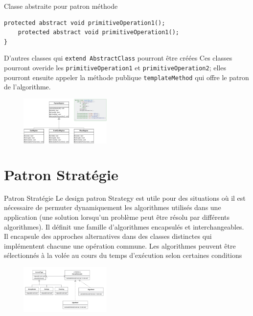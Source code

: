 \documentclass[16pt]{report}
\begin{document}
\begin{multicols*}{2}
\begin{EExample}{Classe abstraite pour patron méthode}{}
\begin{lstlisting}[style=JavaDraculaWhite]
    protected abstract void primitiveOperation1(); 
    protected abstract void primitiveOperation1(); 
}       
\end{lstlisting}
        \end{EExample}

        D'autres classes qui \texttt{extend AbstractClass} pourront être créées 
        Ces classes pourront overide les \texttt{primitiveOperation1} et \texttt{primitiveOperation2}; 
        elles pourront ensuite appeler la méthode publique \texttt{templateMethod} qui offre 
        le patron de l'algorithme. 


        \begin{figure}[H]
            \begin{center}
                \includegraphics[width=0.40\textwidth]{patronMethode.png}
            \end{center}
        \end{figure}

        
        \section{Patron Stratégie}

        \begin{Concept}{Patron Stratégie}{}
            Le design patron Strategy est utile pour des situations où il est nécessaire de permuter
            dynamiquement les algorithmes utilisés dans une application (une solution lorsqu'un
            problème peut être résolu par différents algorithmes).
            Il définit une famille d'algorithmes encapsulés et interchangeables. Il encapsule des
            approches alternatives dans des classes distinctes qui implémentent chacune une
            opération commune.
            Les algorithmes peuvent être sélectionnés à la volée au cours du temps d'exécution
            selon certaines conditions
            
        \end{Concept}       


        \begin{figure}[H]
            \begin{center}
                \includegraphics[width=0.40\textwidth]{PatronStrategy.png}
            \end{center}
        \end{figure}



\end{multicols*}
\end{document}

